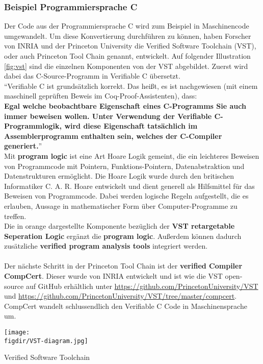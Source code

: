 \subsubsection{Beispiel Programmiersprache C}
Der Code aus der Programmiersprache C wird zum Beispiel in Maschinencode umgewandelt. 
Um diese Konvertierung durchführen zu können, haben Forscher von INRIA und der Princeton University die Verified Software Toolchain (VST), oder auch Princeton Tool Chain genannt, entwickelt. Auf folgender Illustration \ref{fig:vst} sind die einzelnen Komponenten von der VST abgebildet. Zuerst wird dabei das C-Source-Programm in Verifiable C übersetzt. \\
"`Verifiable C ist grundsätzlich korrekt. Das heißt, es ist nachgewiesen (mit einem maschinell geprüften
Beweis im Coq-Proof-Assistenten), dass:\\
\textbf{Egal welche beobachtbare Eigenschaft eines C-Programms Sie auch immer beweisen wollen. Unter Verwendung der Verifiable C-Programmlogik, wird diese Eigenschaft
tatsächlich im Assemblerprogramm enthalten sein, welches der C-Compiler generiert.}"'\\
Mit \textbf{program logic} ist eine Art Hoare Logik gemeint, die ein leichteres Beweisen von Programmcode mit Pointern, Funktions-Pointern, Datenabstraktion und Datenstrukturen ermöglicht.\cite{Appel02:VST} Die Hoare Logik wurde durch den britischen Informatiker C. A. R. Hoare entwickelt und dient generell als Hilfsmittel für das Beweisen von Programmcode. Dabei werden logische Regeln aufgestellt, die es erlauben, Aussage in mathematischer Form über Computer-Programme zu treffen.\\
Die in orange dargestellte Komponente bezüglich der \textbf{VST retargetable Seperation Logic} ergänzt die \textbf{program logic}. Außerdem können dadurch zusätzliche \textbf{verified program analysis tools} integriert werden.\\
\\
Der nächste Schritt in der Princeton Tool Chain ist der \textbf{verified Compiler CompCert}. Dieser wurde von INRIA entwickelt und ist wie die VST open-source auf GitHub erhältlich unter \url{https://github.com/PrincetonUniversity/VST} und \url{https://github.com/PrincetonUniversity/VST/tree/master/compcert}. 
CompCert wandelt schlussendlich den Verifiable C Code in Maschinensprache um.

\begin{minipage}{\textwidth}
	\centering
	\captionsetup{type=figure}
	\texttt{[image: \\figdir/VST-diagram.jpg]}
	\caption{Verified Software Toolchain\cite{PRINCETON01:VST}}
	\label{fig:vst}
\end{minipage}

